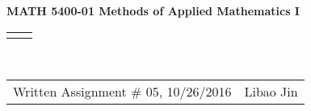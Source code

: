 \documentclass[11pt]{article}
\renewcommand{\title}[1]{\textbf{#1}\\}
\renewcommand{\line}{\begin{tabularx}{\textwidth}{X>{\raggedleft}X}\hline\\\end{tabularx}\\[-0.5cm]}
\newcommand{\leftright}[2]{\begin{tabularx}{\textwidth}{X>{\raggedleft}X}#1%
& #2\\\end{tabularx}\\[-0.5cm]}
\renewcommand{\theequation}{\thesection.\arabic{equation}}
\numberwithin{equation}{section}
\begin{document}
\title{MATH 5400-01 Methods of Applied Mathematics I}
\line
\leftright{Written Assignment \# 05, 10/26/2016}{Libao Jin}

\vspace*{-2cm}
\renewcommand{\theequation}{1.\arabic{equation}}
\setcounter{equation}{0}

\end{document}
